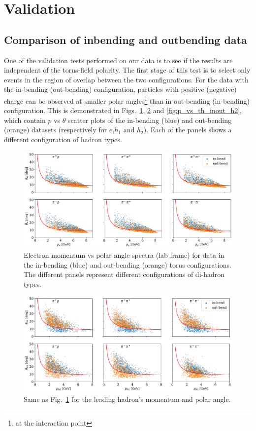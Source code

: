 \section{Validation}
\subsection{Comparison of inbending and outbending data}
One of the validation tests performed on our data is to see if the results are independent of the torus-field polarity.  The first stage of this test is to select only events in the region of overlap between the two configurations.  For the data with the in-bending (out-bending) configuration, particles with positive (negative) charge can be observed at smaller polar angles\footnote{at the interaction point} than in out-bending (in-bending) configuration.  This is demonstrated in Figs.~\ref{fig:p_vs_th_inout_e}, \ref{fig:p_vs_th_inout_h1} and \ref{fig:p_vs_th_inout_h2}, which contain $p$ vs $\theta$ scatter plots of the in-bending (blue) and out-bending (orange) datasets (respectively  for $e$,$h_1$ and $h_2$).  Each of the panels shows a different configuration of hadron types.    

\begin{figure}
    \centering
    \includegraphics[width=\textwidth]{images/p_vs_th_inout_e.pdf}
    \caption{Electron momentum vs polar angle spectra (lab frame) for data in the in-bending (blue) and out-bending (orange) torus configurations.  The different panels represent different configurations of  di-hadron types.}
    \label{fig:p_vs_th_inout_e}
\end{figure}

\begin{figure}
    \centering
    \includegraphics[width=\textwidth]{images/p_vs_th_inout_h1.pdf}
    \caption{Same as Fig.~\ref{fig:p_vs_th_inout_e} for the leading hadron's momentum and polar angle.}
    \label{fig:p_vs_th_inout_h1}
\end{figure}

